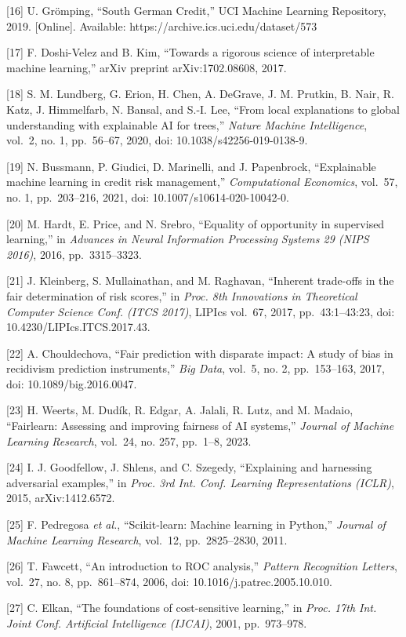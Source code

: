 \documentclass[
  11pt,
]{article}
\begin{document}
{[}16{]} U. Grömping, ``South German Credit,'' UCI Machine Learning
Repository, 2019. {[}Online{]}. Available:
https://archive.ics.uci.edu/dataset/573

{[}17{]} F. Doshi-Velez and B. Kim, ``Towards a rigorous science of
interpretable machine learning,'' arXiv preprint arXiv:1702.08608, 2017.

{[}18{]} S. M. Lundberg, G. Erion, H. Chen, A. DeGrave, J. M. Prutkin,
B. Nair, R. Katz, J. Himmelfarb, N. Bansal, and S.-I. Lee, ``From local
explanations to global understanding with explainable AI for trees,''
\emph{Nature Machine Intelligence}, vol.~2, no. 1, pp.~56--67, 2020,
doi: 10.1038/s42256-019-0138-9.

{[}19{]} N. Bussmann, P. Giudici, D. Marinelli, and J. Papenbrock,
``Explainable machine learning in credit risk management,''
\emph{Computational Economics}, vol.~57, no. 1, pp.~203--216, 2021, doi:
10.1007/s10614-020-10042-0.

{[}20{]} M. Hardt, E. Price, and N. Srebro, ``Equality of opportunity in
supervised learning,'' in \emph{Advances in Neural Information
Processing Systems 29 (NIPS 2016)}, 2016, pp.~3315--3323.

{[}21{]} J. Kleinberg, S. Mullainathan, and M. Raghavan, ``Inherent
trade-offs in the fair determination of risk scores,'' in \emph{Proc.
8th Innovations in Theoretical Computer Science Conf. (ITCS 2017)},
LIPIcs vol.~67, 2017, pp.~43:1--43:23, doi: 10.4230/LIPIcs.ITCS.2017.43.

{[}22{]} A. Chouldechova, ``Fair prediction with disparate impact: A
study of bias in recidivism prediction instruments,'' \emph{Big Data},
vol.~5, no. 2, pp.~153--163, 2017, doi: 10.1089/big.2016.0047.

{[}23{]} H. Weerts, M. Dudík, R. Edgar, A. Jalali, R. Lutz, and M.
Madaio, ``Fairlearn: Assessing and improving fairness of AI systems,''
\emph{Journal of Machine Learning Research}, vol.~24, no. 257, pp.~1--8,
2023.

{[}24{]} I. J. Goodfellow, J. Shlens, and C. Szegedy, ``Explaining and
harnessing adversarial examples,'' in \emph{Proc. 3rd Int. Conf.
Learning Representations (ICLR)}, 2015, arXiv:1412.6572.

{[}25{]} F. Pedregosa \emph{et al.}, ``Scikit-learn: Machine learning in
Python,'' \emph{Journal of Machine Learning Research}, vol.~12,
pp.~2825--2830, 2011.

{[}26{]} T. Fawcett, ``An introduction to ROC analysis,'' \emph{Pattern
Recognition Letters}, vol.~27, no. 8, pp.~861--874, 2006, doi:
10.1016/j.patrec.2005.10.010.

{[}27{]} C. Elkan, ``The foundations of cost-sensitive learning,'' in
\emph{Proc. 17th Int. Joint Conf. Artificial Intelligence (IJCAI)},
2001, pp.~973--978.
\end{document}
